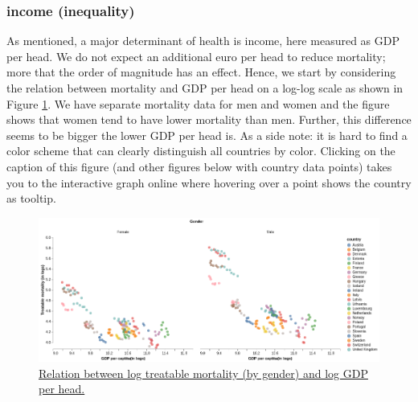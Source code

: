 \documentclass[12pt,english,a4paper]{article}
\begin{document}
\subsubsection{income (inequality)}
\label{sec:orgb89f0a1}

As mentioned, a major determinant of health is income, here measured as GDP per head. We do not expect an additional euro per head to reduce mortality; more that the order of magnitude has an effect. Hence, we start by considering the relation between mortality and GDP per head on a log-log scale as shown in Figure \ref{fig:org450c906}. We have separate mortality data for men and women and the figure shows that women tend to have lower mortality than men. Further, this difference seems to be bigger the lower GDP per head is. As a side note: it is hard to find a color scheme that can clearly distinguish all countries by color. Clicking on the caption of this figure (and other figures below with country data points) takes you to the interactive graph online where hovering over a point shows the country as tooltip.

\begin{figure}[htbp]
\centering
\includegraphics[width=.9\linewidth]{./figures/gdp_mortality.png}
\caption{\label{fig:org450c906}\href{https://janboone.github.io/European-Healthcare-Systems/figures/gdp\_mortality.html}{Relation between log treatable mortality (by gender) and log GDP per head.}}
\end{figure}
\end{document}
